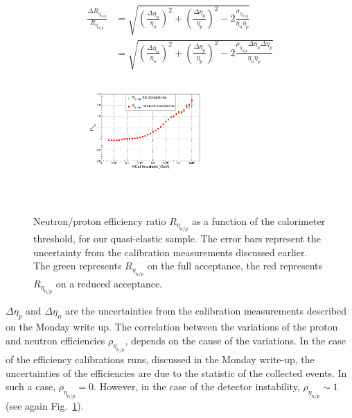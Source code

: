 \documentclass[11pt]{article}
\begin{document}
%
\begin{align}
  \frac{\Delta R_{\eta_{n/p}}}{R_{\eta_{n/p}}} &= \sqrt{ \left( \frac{\Delta \eta_{n}}{\eta_{n}} \right)^2
    + \left( \frac{\Delta \eta_{p}}{\eta_{p}} \right)^2
    - 2 \frac{\sigma_{\eta_{n/p}}}{\eta_{n}\eta_{p}} }
  \\
  &= \sqrt{ \left( \frac{\Delta \eta_{n}}{\eta_{n}} \right)^2
    + \left( \frac{\Delta \eta_{p}}{\eta_{p}} \right)^2
    - 2 \frac{\rho_{\eta_{n/p}} \Delta\eta_{n} \Delta\eta_{p}}{\eta_{n}\eta_{p}} }
  \label{eq:uncert_exact}
\end{align}
%
\begin{figure}[!h]
  \centering
  \includegraphics[width=7cm]{Reta_np_fthr_errs.pdf}
  \caption{Neutron/proton efficiency ratio $R_{\eta_{n/p}}$ as a function of the calorimeter threshold, for our quasi-elastic sample. The error bars represent the uncertainty from the calibration measurements discussed earlier. The green represents $R_{\eta_{n/p}}$ on the full acceptance, the red represents $R_{\eta_{n/p}}$ on a reduced acceptance.
  }
  \label{fig:Reta_np}
\end{figure}
%
$\Delta\eta_{p}$ and $\Delta\eta_{n}$ are the uncertainties from the calibration measurements described on the Monday write up. %
The correlation between the variations of the proton and neutron efficiencies $\rho_{\eta_{n/p}}$, depends on the cause of the variations.
In the case of the efficiency calibrations runs, discussed in the Monday write-up,
the uncertainties of the efficiencies are due to the statistic of the collected events. 
In such a case, $\rho_{\eta_{n/p}} = 0$.
However, in the case of the detector instability, $\rho_{\eta_{n/p}} \sim 1$ (see again Fig.~\ref{fig:Reta_np}).
\end{document}
